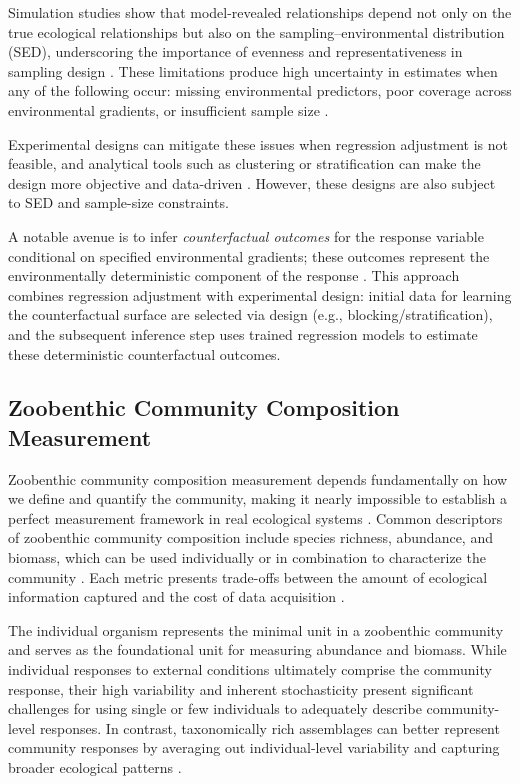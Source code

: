 Simulation studies show that model-revealed relationships depend not only on the true ecological relationships but also on the sampling--environmental distribution (SED), underscoring the importance of evenness and representativeness in sampling design \cite{Fischer2018Uncertainty}.
These limitations produce high uncertainty in estimates when any of the following occur: missing environmental predictors, poor coverage across environmental gradients, or insufficient sample size \cite{Eberhardt1991FieldStudies}.

Experimental designs can mitigate these issues when regression adjustment is not feasible, and analytical tools such as clustering or stratification can make the design more objective and data-driven \cite{Wiens1995AccidentalImpacts}.
However, these designs are also subject to SED and sample-size constraints.

A notable avenue is to infer \textit{counterfactual outcomes} for the response variable conditional on specified environmental gradients; these outcomes represent the environmentally deterministic component of the response \cite{Larsen2019CausalAnalysis, Byrnes2025CausalInference}.
This approach combines regression adjustment with experimental design: initial data for learning the counterfactual surface are selected via design (e.g., blocking/stratification), and the subsequent inference step uses trained regression models to estimate these deterministic counterfactual outcomes.


\subsection{Zoobenthic Community Composition Measurement}

Zoobenthic community composition measurement depends fundamentally on 
how we define and quantify the community, making it nearly impossible to establish a 
perfect measurement framework in real ecological systems \cite{Tampo2021Bioindicators}. 
Common descriptors of zoobenthic community composition include species richness, abundance, and biomass, 
which can be used individually or in combination to characterize the community \cite{Sitati2021AbundanceBiomass}. 
Each metric presents trade-offs between the amount of ecological information captured 
and the cost of data acquisition \cite{Menezes2010Trait}. 

The individual organism represents the minimal unit in a zoobenthic community and serves as 
the foundational unit for measuring abundance and biomass. 
While individual responses to external conditions ultimately comprise the community response,
their high variability and inherent stochasticity present significant challenges 
for using single or few individuals to adequately describe community-level responses.
In contrast, taxonomically rich assemblages can better represent community responses by 
averaging out individual-level variability and capturing broader ecological patterns \cite{Menezes2010Trait}.

